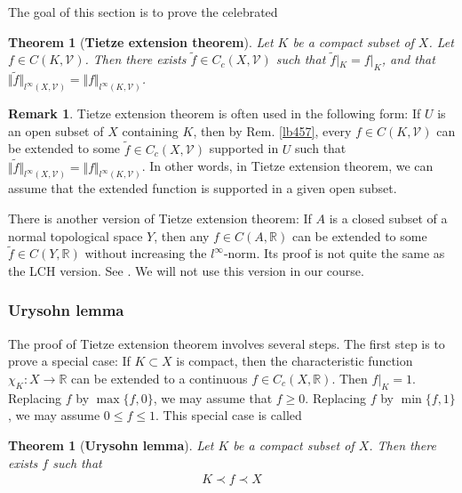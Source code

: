 \documentclass[12pt,b5paper,notitlepage]{article}
\theoremstyle{definition}
\newtheorem{rem}[df]{Remark}
\theoremstyle{plain}
\newtheorem{thm}[df]{Theorem}
\newcommand{\mc}{\mathcal}
\newcommand{\wtd}{\widetilde}
\newcommand{\Rbb}{\mathbb R}
\numberwithin{equation}{section}
\begin{document}
The goal of this section is to prove the celebrated

\begin{thm}[\textbf{Tietze extension theorem}]
Let $K$ be a compact subset of $X$. Let $f\in C(K,\mc V)$. Then there exists $\wtd f\in C_c(X,\mc V)$ such that $\wtd f|_K=f|_K$, and that $\Vert \wtd f\Vert_{l^\infty(X,\mc V)}=\Vert f\Vert_{l^\infty(K,\mc V)}$.
\end{thm}


\begin{rem}
Tietze extension theorem is often used in the following form: If $U$ is an open subset of $X$ containing $K$, then by Rem. \ref{lb457}, every $f\in C(K,\mc V)$ can be extended to some $\wtd f\in C_c(X,\mc V)$ supported in $U$ such that $\Vert \wtd f\Vert_{l^\infty(X,\mc V)}=\Vert f\Vert_{l^\infty(K,\mc V)}$. In other words, in Tietze extension theorem, we can assume that the extended function is supported in a given open subset.
\end{rem}

There is another version of Tietze extension theorem: If $A$ is a closed subset of a normal topological space $Y$, then any $f\in C(A,\Rbb)$ can be extended to some $\wtd f\in C(Y,\Rbb)$ without increasing the  $l^\infty$-norm. Its proof is not quite the same as the LCH version. See \cite[Sec. 35]{Mun}. We will not use this version in our course. 



\subsubsection{Urysohn lemma}



The proof of Tietze extension theorem involves several steps. The first step is to prove a special case: If $K\subset X$ is compact, then the characteristic function $\chi_K:X\rightarrow\Rbb$ can be extended to a continuous $f\in C_c(X,\Rbb)$. Then $f|_K=1$. Replacing $f$ by $\max\{f,0\}$, we may assume that $f\geq0$. Replacing $f$ by $\min\{f,1\}$, we may assume $0\leq f\leq 1$. This special case is called


\begin{thm}[\textbf{Urysohn lemma}]
Let $K$ be a compact subset of $X$. Then there exists $f$ such that   
\begin{align}
K\prec f\prec X
\end{align}
\end{thm}
\end{document}
